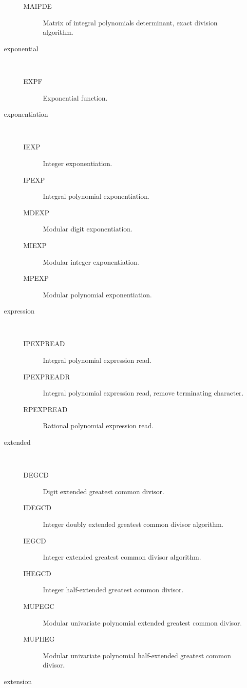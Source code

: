 \begin{description}
  \begin{description}
  \item[MAIPDE]  Matrix of integral polynomials determinant, exact division
    algorithm.
  \end{description}
\item[exponential] \ \ 
  \begin{description}
  \item[EXPF]  Exponential function.
  \end{description}
\item[exponentiation] \ \ 
  \begin{description}
  \item[IEXP]  Integer exponentiation.
  \item[IPEXP]  Integral polynomial exponentiation.
  \item[MDEXP]  Modular digit exponentiation.
  \item[MIEXP]  Modular integer exponentiation.
  \item[MPEXP]  Modular polynomial exponentiation.
  \end{description}
\item[expression] \ \ 
  \begin{description}
  \item[IPEXPREAD]  Integral polynomial expression read.
  \item[IPEXPREADR]  Integral polynomial expression read, remove terminating
    character.
  \item[RPEXPREAD]  Rational polynomial expression read.
  \end{description}
\item[extended] \ \ 
  \begin{description}
  \item[DEGCD]  Digit extended greatest common divisor.
  \item[IDEGCD]  Integer doubly extended greatest common divisor algorithm.
  \item[IEGCD]  Integer extended greatest common divisor algorithm.
  \item[IHEGCD]  Integer half-extended greatest common divisor.
  \item[MUPEGC]  Modular univariate polynomial extended greatest common
    divisor.
  \item[MUPHEG]  Modular univariate polynomial half-extended greatest common
    divisor.
  \end{description}
\item[extension] \ \ 
  \begin{description}

\end{description}
\end{description}
